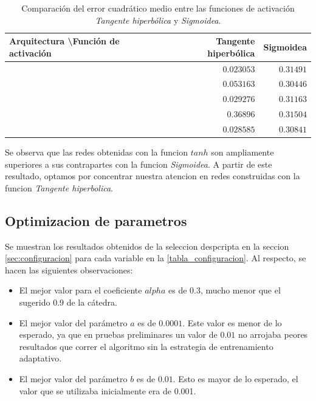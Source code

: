 \documentclass[a4paper,10pt]{article}
\begin{document}
     \begin{table}[H]
        \label{table-comparation-act-functions}

        \begin{center}
        \begin{tabular}{|l|r|r|}
            \hline
            Arquitectura \textbackslash Función de activación & Tangente hiperbólica & Sigmoidea \\
            \hline
            [2 5 4 1] & $0.023053$ & $0.31491$ \\
            \hline
            [3 10 6 1] & $0.053163$ & $0.30446$  \\
            \hline
            [2 10 6 1] & $0.029276$ & $0.31163$  \\
            \hline
            [2 4 2 1]  & $0.36896$ & $0.31504$  \\
            \hline
            [3 14 8 1] & $0.028585$ & $0.30841$  \\
            \hline
        \end{tabular}
        \end{center}
        \caption{Comparación del error cuadrático medio entre las funciones de activación \textit{Tangente hiperbólica} y \textit{Sigmoidea}.}

    \end{table}

    Se observa que las redes obtenidas con la funcion $tanh$ son ampliamente superiores a sus contrapartes con la funcion \textit{Sigmoidea}.
    A partir de este resultado, optamos por concentrar nuestra atencion en redes construidas con la funcion \textit{Tangente hiperbolica}.

    \subsection{Optimizacion de parametros}
    \label{sec:parametros-optimos}

        Se muestran los resultados obtenidos de la seleccion despcripta en la seccion \ref{sec:configuracion} para cada variable en la \ref{tabla_configuracion}. 
        Al respecto, se hacen las siguientes observaciones:

        \begin{itemize}
        \item El mejor valor para el coeficiente $alpha$ es de $0.3$, mucho menor que el sugerido $0.9$ de la cátedra.
        \item El mejor valor del parámetro $a$ es de $0.0001$. Este valor es menor de lo esperado, ya que en pruebas preliminares un valor de $0.01$ 
              no arrojaba peores resultados que correr el algoritmo sin la estrategia de entrenamiento adaptativo.
        \item El mejor valor del parámetro $b$ es de $0.01$. Esto es mayor de lo esperado, el valor que se utilizaba inicialmente era de 0.001.
        \end{itemize}
\end{document}
